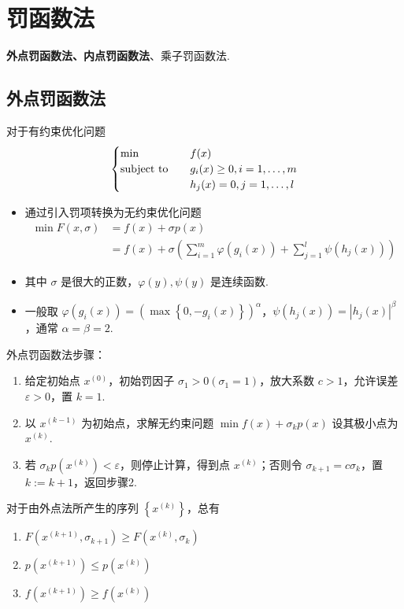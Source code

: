 \section{罚函数法}
\textbf{外点罚函数法、内点罚函数法}、乘子罚函数法.

\subsection{外点罚函数法}
\begin{remark}
    对于有约束优化问题 \[\begin{cases}
        \min \quad &f(x)\\
        \operatorname{subject\ to} \quad &g_i(x) \ge 0, i = 1, \dots, m\\
        &h_j(x) = 0, j = 1, \dots, l
    \end{cases}\]
    \begin{itemize}
        \item 通过引入罚项转换为无约束优化问题 \begin{align*}
            \min F(x, \sigma) &= f(x) + \sigma p(x)\\
            &= f(x) + \sigma \left(\sum_{i = 1}^m \varphi(g_i(x)) + \sum_{j = 1}^l \psi(h_j(x))\right)
        \end{align*}
        \item 其中 $\sigma$ 是很大的正数，$\varphi(y), \psi(y)$ 是连续函数.
        \item 一般取 $\varphi(g_i(x)) = \left(\max\left\{0, -g_i(x)\right\}\right)^\alpha$，$\psi(h_j(x)) = |h_j(x)|^\beta$，通常 $\alpha = \beta = 2$.
    \end{itemize}
\end{remark}

\begin{remark}
    外点罚函数法步骤：\begin{enumerate}
        \item 给定初始点 $x^{(0)}$，初始罚因子 $\sigma_1 > 0(\sigma_1 = 1)$，放大系数 $c > 1$，允许误差 $\varepsilon > 0$，置 $k = 1$.
        \item 以 $x^{(k - 1)}$ 为初始点，求解无约束问题 $\min f(x) + \sigma_k p(x)$ 设其极小点为 $x^{(k)}$.
        \item 若 $\sigma_kp(x^{(k)}) < \varepsilon$，则停止计算，得到点 $x^{(k)}$；否则令 $\sigma_{k + 1} = c\sigma_k$，置 $k := k + 1$，返回步骤2.
    \end{enumerate}
\end{remark}

\begin{theorem}
    对于由外点法所产生的序列 $\left\{x^{(k)}\right\}$，总有\begin{enumerate}
        \item $F(x^{(k + 1)}, \sigma_{k + 1}) \ge F(x^{(k)}, \sigma_k)$
        \item $p(x^{(k + 1)}) \le p(x^{(k)})$
        \item $f(x^{(k + 1)}) \ge f(x^{(k)})$
    \end{enumerate}
\end{theorem}

